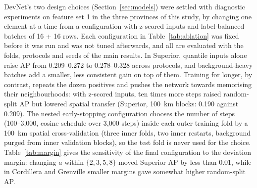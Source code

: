 \documentclass[pdflatex,sn-apa]{sn-jnl}
\begin{document}
\begin{appendices}
DevNet's two design choices (Section~\ref{sec:models}) were settled with diagnostic experiments on feature set 1 in the three provinces of this study, by changing one element at a time from a configuration with z-scored inputs and label-balanced batches of 16 + 16 rows. Each configuration in Table~\ref{tab:ablation} was fixed before it was run and was not tuned afterwards, and all are evaluated with the folds, protocols and seeds of the main results. In Superior, quantile inputs alone raise AP from 0.209--0.272 to 0.278--0.328 across protocols, and background-heavy batches add a smaller, less consistent gain on top of them. Training for longer, by contrast, repeats the dozen positives and pushes the network towards memorising their neighbourhoods: with z-scored inputs, ten times more steps raised random-split AP but lowered spatial transfer (Superior, 100~km blocks: 0.190 against 0.209). The nested early-stopping configuration chooses the number of steps (100--3,000, cosine schedule over 3,000 steps) inside each outer training fold by a 100~km spatial cross-validation (three inner folds, two inner restarts, background purged from inner validation blocks), so the test fold is never used for the choice. Table~\ref{tab:margin} gives the sensitivity of the final configuration to the deviation margin: changing $a$ within $\{2, 3, 5, 8\}$ moved Superior AP by less than 0.01, while in Cordillera and Grenville smaller margins gave somewhat higher random-split AP.


\end{appendices}
\end{document}
